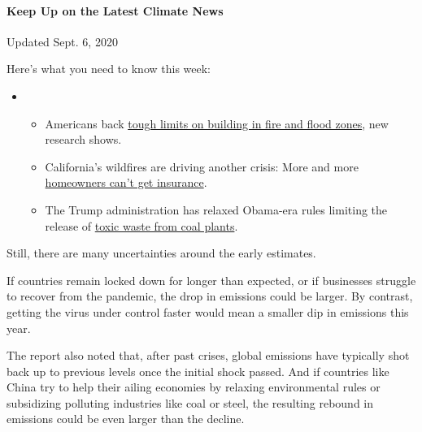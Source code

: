 \hypertarget{keep-up-on-the-latest-climate-news}{%
\paragraph{Keep Up on the Latest Climate
News}\label{keep-up-on-the-latest-climate-news}}

Updated Sept. 6, 2020

Here's what you need to know this week:

\begin{itemize}
\item
  \begin{itemize}
  \tightlist
  \item
    Americans back
    \href{https://www.nytimes3xbfgragh.onion/2020/09/04/climate/flood-fire-building-restrictions.html?action=click\&pgtype=Article\&state=default\&region=MAIN_CONTENT_1\&context=storylines_keepup}{tough
    limits on building in fire and flood zones}, new research shows.
  \item
    California's wildfires are driving another crisis: More and more
    \href{https://www.nytimes3xbfgragh.onion/2020/09/02/climate/wildfires-insurance.html?action=click\&pgtype=Article\&state=default\&region=MAIN_CONTENT_1\&context=storylines_keepup}{homeowners
    can't get insurance}.
  \item
    The Trump administration has relaxed Obama-era rules limiting the
    release of
    \href{https://www.nytimes3xbfgragh.onion/2020/08/31/climate/trump-coal-plants.html?action=click\&pgtype=Article\&state=default\&region=MAIN_CONTENT_1\&context=storylines_keepup}{toxic
    waste from coal plants}.
  \end{itemize}
\end{itemize}

Still, there are many uncertainties around the early estimates.

If countries remain locked down for longer than expected, or if
businesses struggle to recover from the pandemic, the drop in emissions
could be larger. By contrast, getting the virus under control faster
would mean a smaller dip in emissions this year.

The report also noted that, after past crises, global emissions have
typically shot back up to previous levels once the initial shock passed.
And if countries like China try to help their ailing economies by
relaxing environmental rules or subsidizing polluting industries like
coal or steel, the resulting rebound in emissions could be even larger
than the decline.

